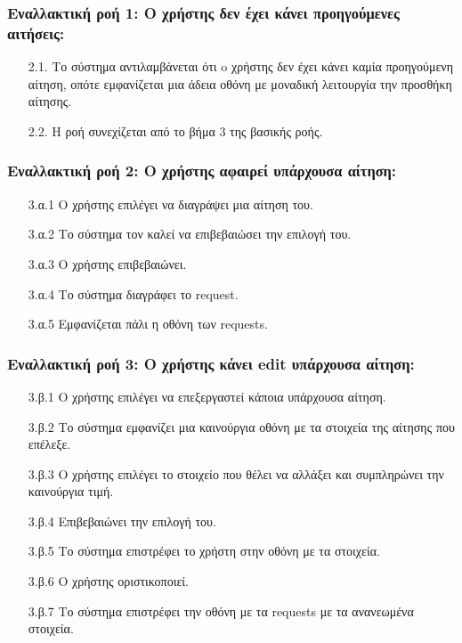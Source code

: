 \documentclass[12pt,a4paper]{article}
\begin{document}
\subsubsection*{Εναλλακτική ροή 1: Ο χρήστης δεν έχει κάνει προηγούμενες αιτήσεις:}
\begin{enumerate}
    \item[2.1.] Το σύστημα αντιλαμβάνεται ότι o χρήστης δεν έχει κάνει καμία προηγούμενη αίτηση, οπότε εμφανίζεται μια άδεια οθόνη με μοναδική λειτουργία την προσθήκη αίτησης.
    \item[2.2.] Η ροή συνεχίζεται από το βήμα 3 της βασικής ροής.
\end{enumerate}

\subsubsection*{Εναλλακτική ροή 2: Ο χρήστης αφαιρεί υπάρχουσα αίτηση:}
\begin{enumerate}
    \item[3.α.1] Ο χρήστης επιλέγει να διαγράψει μια αίτηση του.
    \item[3.α.2] Το σύστημα τον καλεί να επιβεβαιώσει την επιλογή του. 
    \item[3.α.3] Ο χρήστης επιβεβαιώνει.
    \item[3.α.4] Το σύστημα διαγράφει το request.
    \item[3.α.5] Εμφανίζεται πάλι η οθόνη των requests.
\end{enumerate}

\subsubsection*{Εναλλακτική ροή 3: Ο χρήστης κάνει edit υπάρχουσα αίτηση:}
\begin{enumerate}
    \item[3.β.1] Ο χρήστης επιλέγει να επεξεργαστεί κάποια υπάρχουσα αίτηση. 
    \item[3.β.2] Το σύστημα εμφανίζει μια καινούργια οθόνη με τα στοιχεία της αίτησης που επέλεξε. 
    \item[3.β.3] Ο χρήστης επιλέγει το στοιχείο που θέλει να αλλάξει και συμπληρώνει την καινούργια τιμή. 
    \item[3.β.4] Επιβεβαιώνει την επιλογή του.
    \item[3.β.5] Το σύστημα επιστρέφει το χρήστη στην οθόνη με τα στοιχεία. 
    \item[3.β.6] Ο χρήστης οριστικοποιεί.
    \item[3.β.7] Το σύστημα επιστρέφει την οθόνη με τα requests με τα ανανεωμένα στοιχεία.
\end{enumerate}
\end{document}
